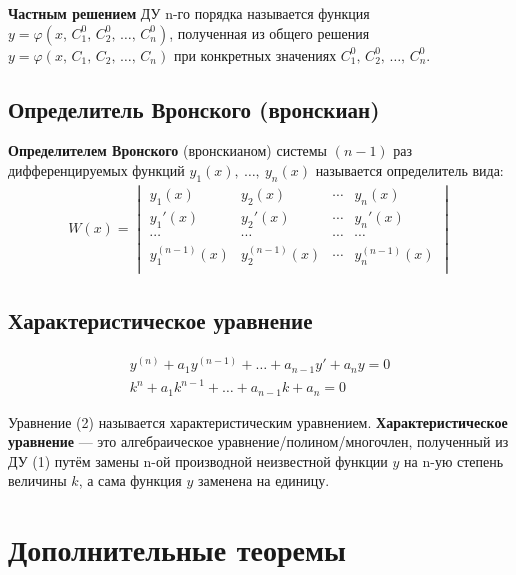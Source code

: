 \begin{definition}
    \textbf{Частным решением} ДУ n-го порядка называется функция\break$y = \varphi(x,\, C_1^0,\, C_2^0,\, \ldots,\, C_n^0)$, полученная из общего решения $y = \varphi(x,\, C_1,\, C_2,\, \ldots,\, C_n)$ при конкретных значениях $C_1^0,\, C_2^0,\, \ldots,\, C_n^0$.
\end{definition}

\subsection{Определитель Вронского (вронскиан)}

\begin{definition}
    \textbf{Определителем Вронского} (вронскианом) системы $(n - 1)$ раз дифференцируемых функций $y_1 (x),\ \ldots,\ y_n(x)$ называется определитель вида:
    \begin{gather*}
        W (x) = \begin{vmatrix}
            y_1(x) & y_2(x) & \cdots & y_n(x) \\
            y_1'(x) & y_2'(x) & \cdots & y_n'(x) \\
            \cdots & \cdots & \cdots & \cdots \\
            y_1^{(n-1)}(x) & y_2^{(n-1)}(x) & \cdots & y_n^{(n-1)}(x) \\
        \end{vmatrix}
    \end{gather*}
\end{definition}

\subsection{Характеристическое уравнение}
\begin{align*}
    y^{(n)} + a_1 y^{(n-1)} + \ldots + a_{n-1} y' + a_n y = 0 \tag{1} \\
    \boxed{k^n + a_1k^{n-1} + \ldots + a_{n-1} k + a_n = 0} \tag{2}
\end{align*}
\begin{definition}
    Уравнение (2) называется характеристическим уравнением. \textbf{Характеристическое уравнение} --- это алгебраическое уравнение/полином/многочлен, полученный из ДУ (1) путём замены n-ой производной неизвестной функции $y$ на n-ую степень величины $k$, а сама функция $y$ заменена на единицу.
\end{definition}

\section{Дополнительные теоремы}


